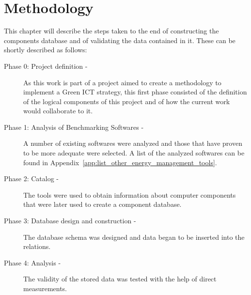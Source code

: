 

\chapter{Methodology} \label{chap3:methodology}

    This chapter will describe the steps taken to the end of constructing the components database and of validating the data contained in it.
These can be shortly described as follows:
    \begin{description}
        \item[Phase 0: Project definition -] As this work is part of a project aimed to create a methodology to implement a Green ICT strategy, this first phase consisted of the definition of the logical components of this project and of how the current work would collaborate to it.
        \item[Phase 1: Analysis of Benchmarking Softwares -] A number of existing softwares were analyzed and those that have proven to be more adequate were selected. A list of the analyzed softwares can be found in Appendix~\ref{app:list_other_energy_management_tools}.
        \item[Phase 2: Catalog -] The tools were used to obtain information about computer components that were later used to create a component database.
        \item[Phase 3: Database design and construction -] The database schema was designed and data began to be inserted into the relations.
        \item[Phase 4: Analysis -] The validity of the stored data was tested with the help of direct measurements.
    \end{description}



